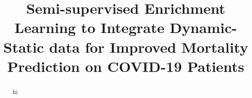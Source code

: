 \documentclass[runningheads]{llncs}
\begin{document}
%
\title{Semi-supervised Enrichment Learning to Integrate Dynamic-Static data for Improved Mortality Prediction on COVID-19 Patients}
%
%
%
\maketitle              %
%
\begin{abstract}
hi

\end{abstract}






%
%
%


%
\end{document}
